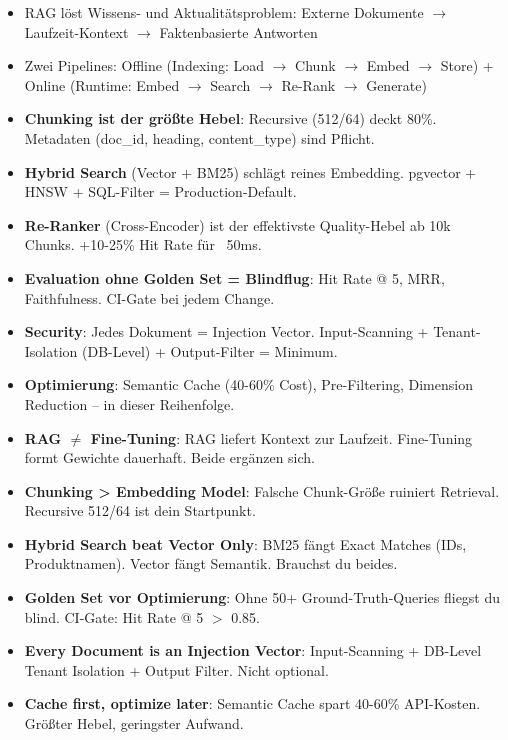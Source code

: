 \begin{itemize}[leftmargin=*]
    \item RAG löst Wissens- und Aktualitätsproblem: Externe Dokumente $\to$ Laufzeit-Kontext $\to$ Faktenbasierte Antworten
    \item Zwei Pipelines: Offline (Indexing: Load $\to$ Chunk $\to$ Embed $\to$ Store) + Online (Runtime: Embed $\to$ Search $\to$ Re-Rank $\to$ Generate)
    \item \textbf{Chunking ist der größte Hebel}: Recursive (512/64) deckt 80\%. Metadaten (doc\_id, heading, content\_type) sind Pflicht.
    \item \textbf{Hybrid Search} (Vector + BM25) schlägt reines Embedding. pgvector + HNSW + SQL-Filter = Production-Default.
    \item \textbf{Re-Ranker} (Cross-Encoder) ist der effektivste Quality-Hebel ab 10k Chunks. +10-25\% Hit Rate für ~50ms.
    \item \textbf{Evaluation ohne Golden Set = Blindflug}: Hit Rate @ 5, MRR, Faithfulness. CI-Gate bei jedem Change.
    \item \textbf{Security}: Jedes Dokument = Injection Vector. Input-Scanning + Tenant-Isolation (DB-Level) + Output-Filter = Minimum.
    \item \textbf{Optimierung}: Semantic Cache (40-60\% Cost), Pre-Filtering, Dimension Reduction -- in dieser Reihenfolge.
\end{itemize}




\par\mbox{}\par
\begin{merkeEnv}
\begin{itemize}
    \item \textbf{RAG $\neq$ Fine-Tuning}: RAG liefert Kontext zur Laufzeit. Fine-Tuning formt Gewichte dauerhaft. Beide ergänzen sich.
    \item \textbf{Chunking > Embedding Model}: Falsche Chunk-Größe ruiniert Retrieval. Recursive 512/64 ist dein Startpunkt.
    \item \textbf{Hybrid Search beat Vector Only}: BM25 fängt Exact Matches (IDs, Produktnamen). Vector fängt Semantik. Brauchst du beides.
    \item \textbf{Golden Set vor Optimierung}: Ohne 50+ Ground-Truth-Queries fliegst du blind. CI-Gate: Hit Rate @ 5 $>$ 0.85.
    \item \textbf{Every Document is an Injection Vector}: Input-Scanning + DB-Level Tenant Isolation + Output Filter. Nicht optional.
    \item \textbf{Cache first, optimize later}: Semantic Cache spart 40-60\% API-Kosten. Größter Hebel, geringster Aufwand.
\end{itemize}
\end{merkeEnv}


